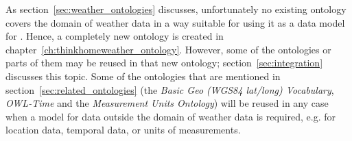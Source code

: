 As section~\ref{sec:weather_ontologies} discusses, unfortunately no existing ontology covers the domain of weather data in a way suitable for using it as a data model for \thinkhome. Hence, a completely new ontology is created in chapter~\ref{ch:thinkhomeweather_ontology}. However, some of the ontologies or parts of them may be reused in that new ontology; section~\ref{sec:integration} discusses this topic. Some of the ontologies that are mentioned in section~\ref{sec:related_ontologies} (the \emph{Basic Geo (WGS84 lat/long) Vocabulary}, \emph{OWL-Time} and the \emph{Measurement Units Ontology}) will be reused in any case when a model for data outside the domain of weather data is required, e.g. for location data, temporal data, or units of measurements.
